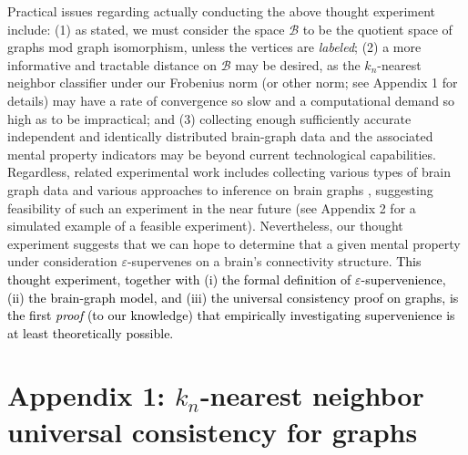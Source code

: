 \documentclass{article}
\newcommand{\mB}{\mathcal{B}}
\providecommand{\tr}[1]{\textcolor{black}{#1}}
\begin{document}
Practical issues regarding actually conducting the above thought experiment include: (1) as stated, we must consider the space $\mB$ to be the quotient space of graphs mod graph isomorphism, unless the vertices are {\it labeled}; (2) a more informative and tractable distance on $\mB$ may be desired, as the $k_n$-nearest neighbor classifier under our Frobenius norm (or other norm; see Appendix 1 for details) may have a rate of convergence so slow and a computational demand so high as to be impractical; and (3) collecting enough sufficiently accurate independent and identically distributed brain-graph data and the associated mental property indicators may be beyond current technological capabilities. Regardless, related experimental work includes collecting various types of brain graph data \cite{WhiteBrenner86, DenkHorstmann04, BriggmanDenk06} and various approaches to inference on brain graphs \cite{MackeBorst08, Mishchenko09, LuLichtman09}, suggesting feasibility of such an experiment in the near future (see Appendix 2 for a simulated example of a feasible experiment). Nevertheless, our thought experiment suggests that we can hope to determine that a given mental property under consideration $\varepsilon$-supervenes on a brain's connectivity structure. \tr{This thought experiment, together with (i) the formal definition of $\varepsilon$-supervenience, (ii) the brain-graph model, and (iii) the universal consistency proof on graphs, is the first \emph{proof} (to our knowledge) that empirically investigating supervenience is at least theoretically possible.}







\section*{Appendix 1: $k_n$-nearest neighbor universal consistency for graphs}
\label{proof}
\end{document}
